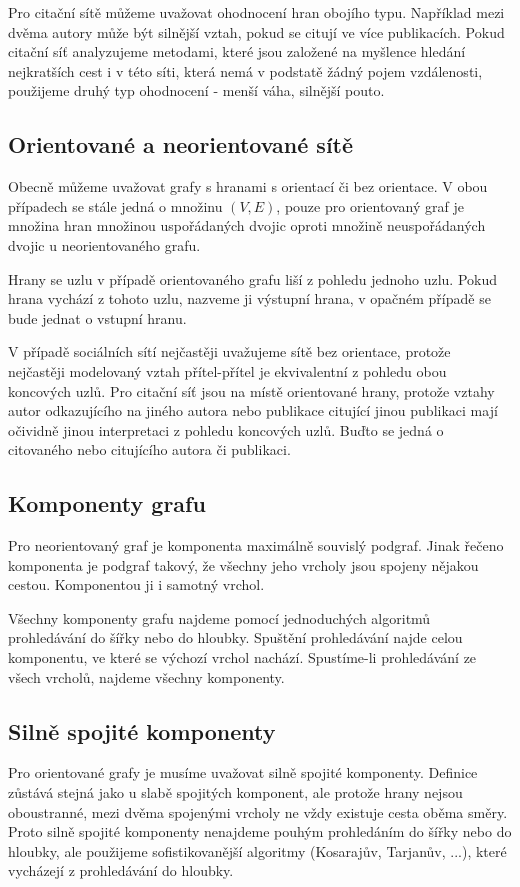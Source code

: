 \documentclass[12pt,titlepage]{report}
\begin{document}
Pro citační sítě můžeme uvažovat ohodnocení hran obojího typu. Například mezi
dvěma autory může být silnější vztah, pokud se citují ve více publikacích.
Pokud citační síť analyzujeme metodami, které jsou založené na myšlence hledání
nejkratších cest i v této síti, která nemá v podstatě žádný pojem vzdálenosti,
použijeme druhý typ ohodnocení - menší váha, silnější pouto.


\subsection{Orientované a neorientované sítě}
Obecně můžeme uvažovat grafy s hranami s orientací či bez orientace. V obou
případech se stále jedná o množinu $(V, E)$, pouze pro orientovaný graf je
množina hran množinou uspořádaných dvojic oproti množině neuspořádaných dvojic
u neorientovaného grafu.

Hrany se uzlu v případě orientovaného grafu liší z pohledu jednoho uzlu. Pokud
hrana vychází z tohoto uzlu, nazveme ji výstupní hrana, v opačném případě se
bude jednat o vstupní hranu.

V případě sociálních sítí nejčastěji uvažujeme sítě bez orientace, protože
nejčastěji modelovaný vztah přítel-přítel je ekvivalentní z pohledu obou
koncových uzlů. Pro citační síť jsou na místě orientované hrany, protože vztahy
autor odkazujícího na jiného autora nebo publikace citující jinou publikaci
mají očividně jinou interpretaci z pohledu koncových uzlů. Buďto se jedná o
citovaného nebo citujícího autora či publikaci.

\subsection{Komponenty grafu}
Pro neorientovaný graf je komponenta maximálně souvislý podgraf. Jinak řečeno
komponenta je podgraf takový, že všechny jeho vrcholy jsou spojeny nějakou
cestou. Komponentou ji i samotný vrchol.

Všechny komponenty grafu najdeme pomocí jednoduchých algoritmů prohledávání do
šířky nebo do hloubky. Spuštění prohledávání najde celou komponentu, ve které
se výchozí vrchol nachází. Spustíme-li prohledávání ze všech vrcholů, najdeme
všechny komponenty. 

\subsection{Silně spojité komponenty}
Pro orientované grafy je musíme uvažovat silně spojité komponenty. Definice
zůstává stejná jako u slabě spojitých komponent, ale protože hrany nejsou
oboustranné, mezi dvěma spojenými vrcholy ne vždy existuje cesta oběma směry.
Proto silně spojité komponenty nenajdeme pouhým prohledáním do šířky nebo do
hloubky, ale použijeme sofistikovanější algoritmy (Kosarajův, Tarjanův, ...),
které vycházejí z prohledávání do hloubky.
\end{document}
